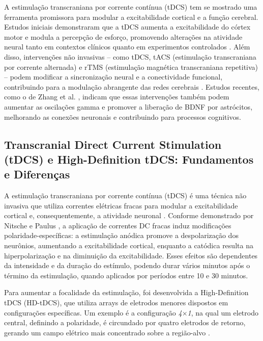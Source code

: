 A estimulação transcraniana por corrente contínua (tDCS) tem se mostrado uma ferramenta promissora para modular a excitabilidade cortical e a função cerebral. Estudos iniciais demonstraram que a tDCS aumenta a excitabilidade do córtex motor e modula a percepção de esforço, promovendo alterações na atividade neural tanto em contextos clínicos quanto em experimentos controlados \cite{nitsche2000excitability, okano2013estimulacao}. Além disso, intervenções não invasivas – como tDCS, tACS (estimulação transcraniana por corrente alternada) e rTMS (estimulação magnética transcraniana repetitiva) – podem modificar a sincronização neural e a conectividade funcional, contribuindo para a modulação abrangente das redes cerebrais \cite{scheler2019neuromodulation, kunze2014high}. Estudos recentes, como o de Zhang et al. \cite{zhang2024closed}, indicam que essas intervenções também podem aumentar as oscilações gamma e promover a liberação de BDNF por astrócitos, melhorando as conexões neuronais e contribuindo para processos cognitivos.

\subsection{Transcranial Direct Current Stimulation (tDCS) e High-Definition tDCS: Fundamentos e Diferenças}\label{subsec:tdcs_hdtdcs}

A estimulação transcraniana por corrente contínua (tDCS) é uma técnica não invasiva que utiliza correntes elétricas fracas para modular a excitabilidade cortical e, consequentemente, a atividade neuronal \cite{stagg2011physiological}. Conforme demonstrado por Nitsche e Paulus \cite{nitsche2000excitability}, a aplicação de correntes DC fracas induz modificações polaridade-específicas: a estimulação anódica promove a despolarização dos neurônios, aumentando a excitabilidade cortical, enquanto a catódica resulta na hiperpolarização e na diminuição da excitabilidade. Esses efeitos são dependentes da intensidade e da duração do estímulo, podendo durar vários minutos após o término da estimulação, quando aplicados por períodos entre 10 e 30 minutos.

Para aumentar a focalidade da estimulação, foi desenvolvida a High-Definition tDCS (HD-tDCS), que utiliza arrays de eletrodos menores dispostos em configurações específicas. Um exemplo é a configuração \emph{4$\times$1}, na qual um eletrodo central, definindo a polaridade, é circundado por quatro eletrodos de retorno, gerando um campo elétrico mais concentrado sobre a região-alvo \cite{villamar2013hdtdcs}.


